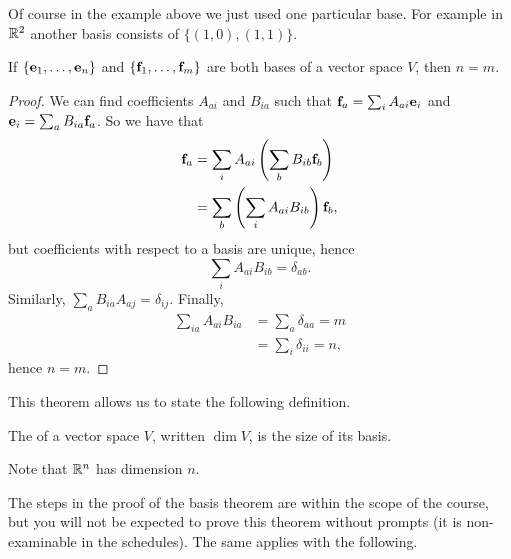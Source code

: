 \documentclass[a4paper]{scrartcl}
\begin{document}
Of course in the example above we just used one particular base. 
For example in $\mathbb{R}^2$ another basis consists of $\{(1, 0), (1, 1)\}$. 

\begin{theorem}
    If $\{\mathbf{e}_1, \dots, \mathbf{e}_n\}$ and $\{\mathbf{f}_1, \dots, \mathbf{f}_m\}$ are both bases of a vector space $V$, then $n = m$.
\end{theorem}
\begin{proof}
    We can find coefficients $A_{ai}$ and $B_{ia}$ such that $\mathbf{f}_a = \sum_i A_{ai} \mathbf{e}_i$ and $\mathbf{e}_i = \sum_a B_{ia} \mathbf{f}_a$. So we have that
    \begin{align*}
    \mathbf{f}_a &= \sum_i A_{ai} \left(\sum_b B_{ib} \mathbf{f}_b\right) \\
        &= \sum_b \left(\sum_{i} A_{ai} B_{ib}\right)\mathbf{f}_b,
\end{align*}
    but coefficients with respect to a basis are unique, hence
    $$
    \sum_{i} A_{ai} B_{ib} = \delta_{ab}.
    $$
    Similarly, $\sum_{a} B_{ia} A_{aj} = \delta_{ij}$. Finally,
    \begin{align*}
        \sum_{ia} A_{ai} B_{ia} &= \sum_{a} \delta_{aa} = m \\
        &= \sum_i \delta_{ii} = n,
     \end{align*}
     hence $n = m$.
\end{proof}

This theorem allows us to state the following definition.

\begin{definition}[Dimension]
    The  of a vector space $V$, written $\operatorname{dim} V$, is the size of its basis.
\end{definition}

Note that $\mathbb{R}^n$ has dimension $n$.

The steps in the proof of the basis theorem are within the scope of the course, but you will not be expected to prove this theorem without prompts (it is non-examinable in the schedules). The same applies with the following.
\end{document}
